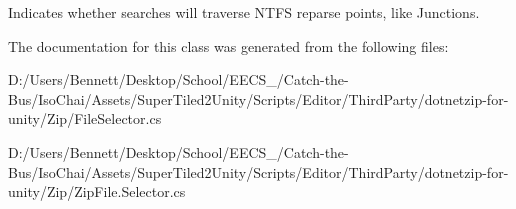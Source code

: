 Indicates whether searches will traverse N\+T\+FS reparse points, like Junctions. 



The documentation for this class was generated from the following files\+:\begin{DoxyCompactItemize}
\item 
D\+:/\+Users/\+Bennett/\+Desktop/\+School/\+E\+E\+C\+S\+\_/\+Catch-\/the-\/\+Bus/\+Iso\+Chai/\+Assets/\+Super\+Tiled2\+Unity/\+Scripts/\+Editor/\+Third\+Party/dotnetzip-\/for-\/unity/\+Zip/File\+Selector.\+cs\item 
D\+:/\+Users/\+Bennett/\+Desktop/\+School/\+E\+E\+C\+S\+\_/\+Catch-\/the-\/\+Bus/\+Iso\+Chai/\+Assets/\+Super\+Tiled2\+Unity/\+Scripts/\+Editor/\+Third\+Party/dotnetzip-\/for-\/unity/\+Zip/Zip\+File.\+Selector.\+cs\end{DoxyCompactItemize}
